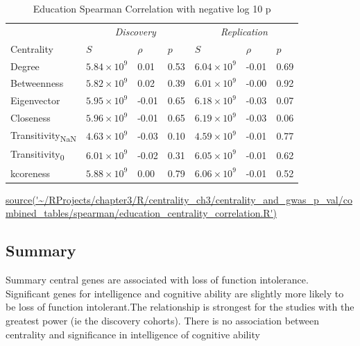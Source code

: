\begin{table}[ht]
\centering
\setlength{\extrarowheight}{2pt}
\begin{tabular}{l@{\hskip 20pt}lll@{\hskip 20pt}lll}

  \toprule
  &  \multicolumn{3}{c}{\textit{Discovery}} & \multicolumn{3}{c}{\textit{Replication}} \\
  \cmidrule{2-7}
Centrality & $S$ & $\rho$ & $p$ & $S$ & $\rho$ & $p$ \\ 
  \midrule
Degree & $5.84 \times 10^{9}$ & 0.01 & 0.53 & $6.04 \times 10^{9}$ & -0.01 & 0.69 \\ 
  Betweenness & $5.82 \times 10^{9}$ & 0.02 & 0.39 & $6.01 \times 10^{9}$ & -0.00 & 0.92 \\ 
  Eigenvector & $5.95 \times 10^{9}$ & -0.01 & 0.65 & $6.18 \times 10^{9}$ & -0.03 & 0.07 \\ 
  Closeness & $5.96 \times 10^{9}$ & -0.01 & 0.65 & $6.19 \times 10^{9}$ & -0.03 & 0.06 \\ 
  Transitivity\textsubscript{NaN} & $4.63 \times 10^{9}$ & -0.03 & 0.10 & $4.59 \times 10^{9}$ & -0.01 & 0.77 \\ 
  Transitivity\textsubscript{0} & $6.01 \times 10^{9}$ & -0.02 & 0.31 & $6.05 \times 10^{9}$ & -0.01 & 0.62 \\ 
  kcoreness & $5.88 \times 10^{9}$ & 0.00 & 0.79 & $6.06 \times 10^{9}$ & -0.01 & 0.52 \\ 
   \bottomrule
\end{tabular}
\caption{Education Spearman Correlation with negative log 10 p}
\tiny\url{source('~/RProjects/chapter3/R/centrality_ch3/centrality_and_gwas_p_val/combined_tables/spearman/education_centrality_correlation.R')}
\label{tab:Education Spearman Correlation}
\end{table}



\subsection{Summary}
Summary central genes are associated with loss of function intolerance. Significant genes for intelligence and cognitive ability are slightly more likely to be loss of function intolerant.The relationship is strongest for the studies with the greatest power (ie the discovery cohorts).  There is no association between centrality and significance in intelligence of cognitive ability















